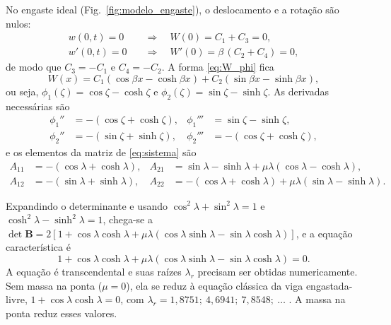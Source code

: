 No engaste ideal (Fig.~\ref{fig:modelo_engaste}), o deslocamento e a rotação são nulos:
\begin{subequations}
    \label{eq:cc_engaste}
    \begin{align}
        w(0,t) = 0  & \quad\Longrightarrow\quad W(0) = C_1 + C_3 = 0,           \\
        w'(0,t) = 0 & \quad\Longrightarrow\quad W'(0) = \beta\,(C_2 + C_4) = 0,
    \end{align}
\end{subequations}
de modo que $C_3 = -C_1$ e $C_4 = -C_2$. A forma \eqref{eq:W_phi} fica
\begin{equation}
    W(x) = C_1\left(\cos\beta x - \cosh\beta x\right)
    + C_2\left(\sin\beta x - \sinh\beta x\right),
    \label{eq:W_engaste}
\end{equation}
ou seja, $\phi_1(\zeta) = \cos\zeta - \cosh\zeta$ e
$\phi_2(\zeta) = \sin\zeta - \sinh\zeta$. As derivadas necessárias são
\begin{align*}
    \phi_1'' & = -(\cos\zeta + \cosh\zeta), & \phi_1''' & = \sin\zeta - \sinh\zeta,    \\
    \phi_2'' & = -(\sin\zeta + \sinh\zeta), & \phi_2''' & = -(\cos\zeta + \cosh\zeta),
\end{align*}
e os elementos da matriz de \eqref{eq:sistema} são
\begin{equation}
    \begin{aligned}
        A_{11} & = -(\cos\lambda + \cosh\lambda),                                          &
        A_{21} & = \sin\lambda - \sinh\lambda + \mu\lambda(\cos\lambda - \cosh\lambda),      \\
        A_{12} & = -(\sin\lambda + \sinh\lambda),                                          &
        A_{22} & = -(\cos\lambda + \cosh\lambda) + \mu\lambda(\sin\lambda - \sinh\lambda).
    \end{aligned}
    \label{eq:A_engaste}
\end{equation}

Expandindo o determinante e usando $\cos^2\lambda + \sin^2\lambda = 1$ e
$\cosh^2\lambda - \sinh^2\lambda = 1$, chega-se a
$\det\mathbf{B} = 2\left[1 + \cos\lambda\cosh\lambda
        + \mu\lambda(\cos\lambda\sinh\lambda - \sin\lambda\cosh\lambda)\right]$, e a equação
característica é
\begin{equation}
    1 + \cos\lambda\cosh\lambda
    + \mu\lambda\left(\cos\lambda\sinh\lambda - \sin\lambda\cosh\lambda\right) = 0.
    \label{eq:car_engaste}
\end{equation}
A equação é transcendental e suas raízes $\lambda_r$ precisam ser obtidas
numericamente. Sem massa na ponta ($\mu = 0$), ela se reduz à equação clássica da viga
engastada-livre, $1 + \cos\lambda\cosh\lambda = 0$, com
$\lambda_r = 1{,}8751;\ 4{,}6941;\ 7{,}8548;\ \dots$ \cite{rao2019}. A massa na ponta
reduz esses valores.

